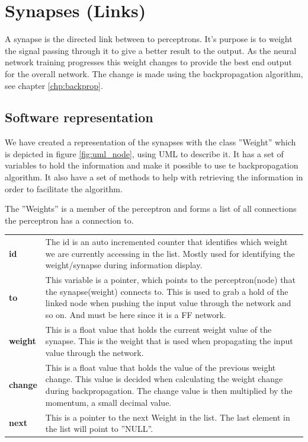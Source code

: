 \section{Synapses (Links)}
A \gls{synapse} is the directed link between to \gls{perceptron}s. It's purpose
is to weight the signal passing through it to give a better result to the
output. As the neural network training progresses this weight changes to provide
the best end output for the overall network.  The change is made using the
backpropagation algorithm, see chapter \ref{chp:backprop}.


\subsection{Software representation}
We have created a representation of the synapses with the class ''Weight'' which
is depicted in figure \ref{fig:uml_node}, using UML to describe it.  It has a
set of variables to hold the information and make it possible to use te
backpropagation algorithm. It also have a set of methods to help with retrieving
the information in order to facilitate the algorithm.

The ''Weights'' is a member of the perceptron and forms a list of all
connections the perceptron has a connection to.

\begin{longtable}{ p{}  p{} }
\textbf{id} &			The id is an auto incremented counter that identifies which
	weight we are currently accessing in the list. Mostly used for identifying
	the weight/synapse during information display. \\
\textbf{to} &			This variable is a pointer, which points to the perceptron(node)
	that the synapse(weight) connects to. This is used to grab a hold of the
	linked node when pushing the input value through the network and so on. And
	must be here since it is a \gls{FF} network. \\
\textbf{weight} &	This is a float value that holds the current weight value of the
	synapse. This is the weight that is used when propagating the input value
	through the network.\\
\textbf{change} &	This is a float value that holds the value of the previous
	weight change. This value is decided when calculating the weight change
	during backpropagation. The change value is then multiplied by the momentum, a
	small decimal value.\\
\textbf{next} &		This is a pointer to the next Weight in the list. The last
	element in the list will point to ''NULL''.\\
\end{longtable}


